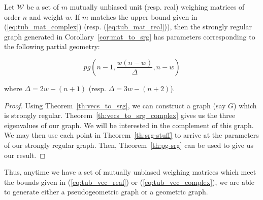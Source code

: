 \begin{theorem}\label{th:mat_to_pg}
 Let $\mathcal{W}$ be a set of $m$ mutually unbiased unit (resp. real) weighing matrices of order $n$ and weight $w$. If $m$ matches the upper bound given in (\ref{eq:tub_mat_complex}) (resp. (\ref{eq:tub_mat_real})), then the strongly regular graph generated in Corollary~\ref{cor:mat_to_srg} has parameters corresponding to the following partial geometry: 

$$pg\left(n-1,\frac{w(n-w)}{\Delta},n-w\right)$$

where $\Delta = 2w - (n+1)$ (resp. $\Delta = 3w - (n+2)$).

\begin{proof}
 Using Theorem~\ref{th:vecs_to_srg}, we can construct a graph (say $G$) which is strongly regular. Theorem~\ref{th:vecs_to_srg_complex} gives us the three eigenvalues of our graph. We will be interested in the complement of this graph. We may then use each point in Theorem~\ref{th:srg-stuff} to arrive at the parameters of our strongly regular graph. Then, Theorem~\ref{th:pg-srg} can be used to give us our result.
\end{proof}

\end{theorem}

Thus, anytime we have a set of mutually unbiased weighing matrices which meet the bounds given in (\ref{eq:tub_vec_real}) or (\ref{eq:tub_vec_complex}), we are able to generate either a pseudogeometric graph or a geometric graph.

